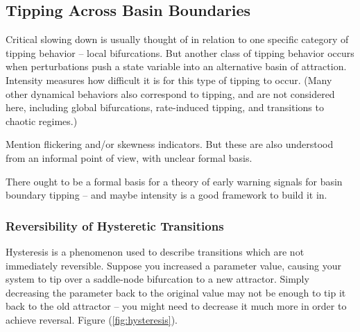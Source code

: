 

\subsection{Tipping Across Basin Boundaries}

Critical slowing down is usually thought of in relation to one specific category of tipping behavior – local bifurcations. But another class of tipping behavior occurs when perturbations push a state variable into an alternative basin of attraction. Intensity measures how difficult it is for this type of tipping to occur. (Many other dynamical behaviors also correspond to tipping, and are not considered here, including global bifurcations, rate-induced tipping, and transitions to chaotic regimes.)

Mention flickering and/or skewness indicators. But these are also understood from an informal point of view, with unclear formal basis. 

There ought to be a formal basis for a theory of early warning signals for basin boundary tipping -- and maybe intensity is a good framework to build it in.

\subsubsection{Reversibility of Hysteretic Transitions}

Hysteresis is a phenomenon used to describe transitions which are not immediately reversible. Suppose you increased a parameter value, causing your system to tip over a saddle-node bifurcation to a new attractor. Simply decreasing the parameter back to the original value may not be enough to tip it back to the old attractor -- you might need to decrease it much more in order to achieve reversal. Figure (\ref{fig:hysteresis}).

